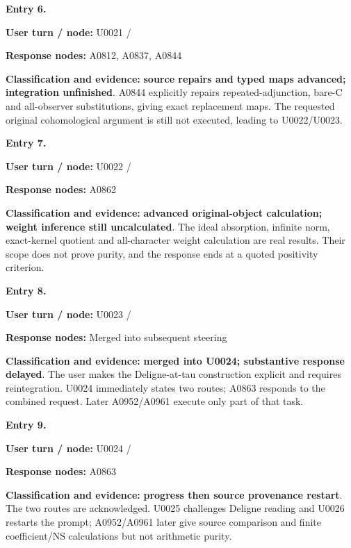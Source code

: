
\textbf{Entry 6.}

\textbf{User turn / node:} U0021 /
\protect{}

\textbf{Response nodes:} A0812, A0837, A0844

\textbf{Classification and evidence:} \textbf{source repairs and typed
maps advanced; integration unfinished}. A0844 explicitly repairs
repeated-adjunction, bare-C and all-observer substitutions, giving exact
replacement maps. The requested original cohomological argument is still
not executed, leading to U0022/U0023.


\textbf{Entry 7.}

\textbf{User turn / node:} U0022 /
\protect{}

\textbf{Response nodes:} A0862

\textbf{Classification and evidence:} \textbf{advanced original-object
calculation; weight inference still uncalculated}. The ideal absorption,
infinite norm, exact-kernel quotient and all-character weight
calculation are real results. Their scope does not prove purity, and the
response ends at a quoted positivity criterion.


\textbf{Entry 8.}

\textbf{User turn / node:} U0023 /
\protect{}

\textbf{Response nodes:} Merged into subsequent steering

\textbf{Classification and evidence:} \textbf{merged into U0024;
substantive response delayed}. The user makes the Deligne-at-tau
construction explicit and requires reintegration. U0024 immediately
states two routes; A0863 responds to the combined request. Later
A0952/A0961 execute only part of that task.


\textbf{Entry 9.}

\textbf{User turn / node:} U0024 /
\protect{}

\textbf{Response nodes:} A0863

\textbf{Classification and evidence:} \textbf{progress then source
provenance restart}. The two routes are acknowledged. U0025 challenges
Deligne reading and U0026 restarts the prompt; A0952/A0961 later give
source comparison and finite coefficient/NS calculations but not
arithmetic purity.


